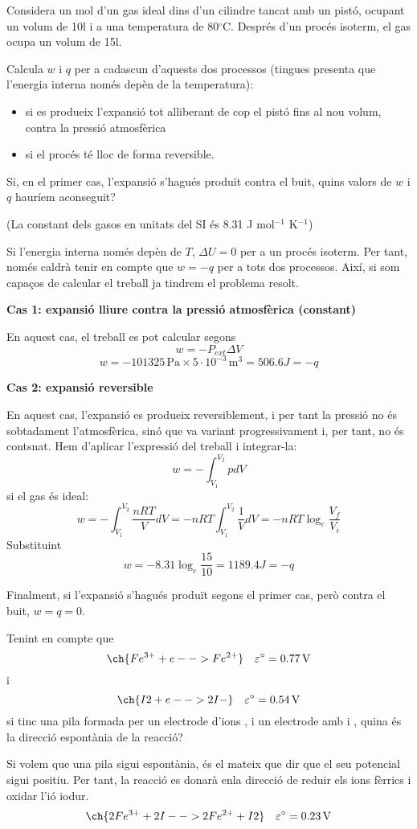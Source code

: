 \documentclass[11pt]{article}
\begin{document}
{Considera un mol d'un gas ideal dins d'un cilindre tancat amb un pistó, ocupant un volum de 10l i a una temperatura de 80$^{\circ}$C. Després d'un procés isoterm, el gas ocupa un volum de 15l.

Calcula $w$ i $q$ per a cadascun d'aquests dos processos (tingues presenta que l'energia interna només depèn de la temperatura):
\begin{itemize}
\item si es produeix l'expansió tot alliberant de cop el pistó fins al nou volum, contra la pressió atmosfèrica
\item si el procés té lloc de forma reversible.
\end{itemize}

Si, en el primer cas, l'expansió s'hagués produït contra el buit, quins valors de $w$ i $q$ hauríem aconseguit?

(La constant dels gasos en unitats del SI és 8.31 J mol$^{-1}$ K$^{-1}$)
}
{
\vfill
\newpage
}
{
Si l'energia interna només depèn de $T$, $\Delta U=0$ per a un procés isoterm. Per tant, només caldrà tenir en compte que $w=-q$ per a tots dos processos. Així, si som capaços de calcular el treball ja tindrem el problema resolt.

{\bf Cas 1: expansió lliure contra la pressió atmosfèrica (constant)}

En aquest cas, el treball es pot calcular segons
\[w = -P_{ext} \Delta V\]
\[w = -101325 \, \mathrm{Pa} \times 5 \cdot 10^{-3} \, \mathrm{m}^3 = 506.6 J = -q\]

{\bf Cas 2: expansió reversible}

En aquest cas, l'expansió es produeix reversiblement, i per tant la pressió no és sobtadament l'atmosfèrica, sinó que va variant progressivament i, per tant, no és contsnat. Hem d'aplicar l'expressió del treball i integrar-la:
\[w= -\int_{V_1}^{V_2} p dV \]
si el gas és ideal:
\[w= -\int_{V_1}^{V_2} \frac{nRT}{V} dV = -nRT \int_{V_1}^{V_2} \frac{1}{V} dV = -nRT \log_e \frac{V_f}{V_i} \]
Substituint
\[w=-8.31 \log_e \frac{15}{10} = 1189.4 J = -q\]

Finalment, si l'expansió s'hagués produït segons el primer cas, però contra el buit, $w=q=0$. 

}

{
Tenint en compte que 
\[\ch{Fe^{3+} + e- ->  Fe^{2+}} \quad \varepsilon^{\circ} = 0.77 \, \mathrm{V} \] 
i
\[\ch{I2 + e- ->  2 I-} \quad \varepsilon^{\circ} = 0.54 \, \mathrm{V} \]
si tinc una pila formada per un electrode d'ions ,  i un electrode amb  i , quina és la direcció espontània de la reacció?
}
{
\vfill

}
{
Si volem que una pila sigui espontània, és el mateix que dir que el seu potencial sigui positiu. Per tant, la reacció es donarà enla direcció de reduir els ions fèrrics i oxidar l'ió iodur.
\[\ch{2 Fe^{3+} + 2 I- ->  2 Fe^{2+} + I2} \quad \varepsilon^{\circ} = 0.23 \, \mathrm{V} \]
}



\problemsdone
\end{document}
